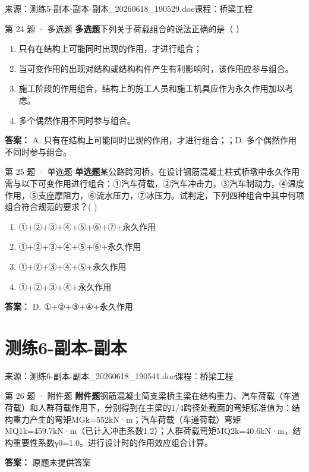 \documentclass[UTF8,zihao=-4,openany]{ctexbook}
\newenvironment{choices}{\begin{enumerate}[label=\Alph*.,leftmargin=9mm,labelsep=3mm,itemsep=2pt,topsep=4pt]}{\end{enumerate}}
\newcommand{\qtype}[1]{\textcolor{brand}{\sffamily\bfseries #1}}
\newcommand{\sourcefile}[1]{\textcolor{muted}{\small\sffamily 来源：#1}}
\begin{document}
\sourcefile{测练5-副本-副本-副本\_20260618\_190529.doc}\quad \textcolor{muted}{\small\sffamily 课程：桥梁工程}

\begin{questionbox}{第 24 题 · 多选题}
\qtype{多选题}\quad 下列关于荷载组合的说法正确的是（ ）
\begin{choices}
\item 只有在结构上可能同时出现的作用，才进行组合；
\item 当可变作用的出现对结构或结构构件产生有利影响时，该作用应参与组合。
\item 施工阶段的作用组合，结构上的施工人员和施工机具应作为永久作用加以考虑。
\item 多个偶然作用不同时参与组合。
\end{choices}
\begin{answerbox}
\textbf{答案：} A. 只有在结构上可能同时出现的作用，才进行组合；；D. 多个偶然作用不同时参与组合。
\end{answerbox}
\end{questionbox}

\begin{questionbox}{第 25 题 · 单选题}
\qtype{单选题}\quad 某公路跨河桥，在设计钢筋混凝土柱式桥墩中永久作用需与以下可变作用进行组合：①汽车荷载，②汽车冲击力，③汽车制动力，④温度作用，⑤支座摩阻力，⑥流水压力，⑦冰压力。试判定，下列四种组合中其中何项组合符合规范的要求？( )
\begin{choices}
\item ①+②+③+④+⑤+⑥+⑦+永久作用
\item ①+②+③+④+⑤+⑥+永久作用
\item ①+②+③+④+⑤+永久作用
\item ①+②+③+④+永久作用
\end{choices}
\begin{answerbox}
\textbf{答案：} D. ①+②+③+④+永久作用
\end{answerbox}
\end{questionbox}

\chapter{测练6-副本-副本}

\sourcefile{测练6-副本-副本\_20260618\_190541.doc}\quad \textcolor{muted}{\small\sffamily 课程：桥梁工程}

\begin{questionbox}{第 26 题 · 附件题}
\qtype{附件题}\quad 钢筋混凝土简支梁桥主梁在结构重力、汽车荷载（车道荷载）和人群荷载作用下，分别得到在主梁的1/4跨径处截面的弯矩标准值为：结构重力产生的弯矩MGk=552kN·m；汽车荷载（车道荷载）弯矩MQ1k=459.7kN·m（已计入冲击系数1.2）；人群荷载弯矩MQ2k=40.6kN·m，结构重要性系数γ0=1.0。进行设计时的作用效应组合计算。
\begin{answerbox}
\textbf{答案：} 原题未提供答案
\end{answerbox}
\end{questionbox}
\end{document}
